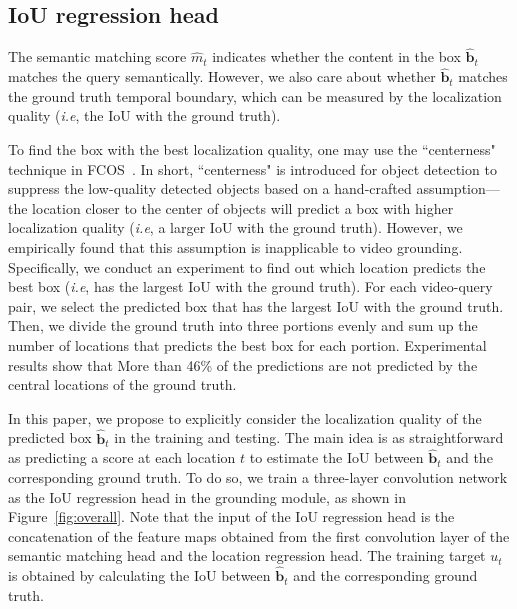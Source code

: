 \documentclass[10pt,twocolumn,letterpaper]{article}
\def\ie{\emph{i.e}\onedot} \def\Ie{\emph{I.e}\onedot}
\begin{document}
	


	\subsection{IoU regression head}
	\label{sec:iou-head}
	
	The semantic matching score $\hat{m}_t$ indicates whether the content in the box $\hat{\mathbf{b}}_{t}$ matches the query semantically. However, we also care about whether $\hat{\mathbf{b}}_{t}$ matches the ground truth temporal boundary, which can be measured by the localization quality (\ie, the IoU with the ground truth).
	
	To find the box with the best localization quality, one may use the ``centerness" technique in FCOS~\cite{tian2019fcos}. In short, ``centerness" is introduced for object detection to suppress the low-quality detected objects based on a hand-crafted assumption---the location closer to the center of objects will predict a box with higher localization quality (\ie, a larger IoU with the ground truth). However, we empirically found that this assumption is inapplicable to video grounding. Specifically, we conduct an experiment to find out which location predicts the best box (\ie, has the largest IoU with the ground truth).
	For each video-query pair, we select the predicted box that has the largest IoU with the ground truth.
Then, we divide the ground truth into three portions evenly and sum up the number of locations that predicts the best box for each portion.
Experimental results show that More than 46\% of the predictions are not predicted by the central locations of the ground truth.
	
	
	
	In this paper, we propose to explicitly consider the localization quality of the predicted box $\hat{\mathbf{b}}_{t}$ in the training and testing. The main idea is as straightforward as predicting a score at each location $t$ to estimate the IoU between $\hat{\mathbf{b}}_{t}$ and the corresponding ground truth. To do so, we train a three-layer convolution network as the IoU regression head in the grounding module, as shown in Figure~\ref{fig:overall}. Note that the input of the 
	IoU regression head is the concatenation of the feature maps obtained from the first convolution layer of the semantic matching head and the location regression head.
The training target $u_t$ is obtained by calculating the IoU between $\hat{\mathbf{b}}_{t}$ and the corresponding ground truth. 
	
\end{document}
